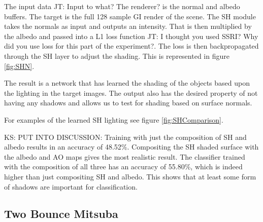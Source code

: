 \documentclass[10pt,twocolumn,letterpaper]{article}
\newcommand{\kris}[1]{{\color{red} KS: #1}}
\newcommand{\tompson}[1]{{\color{green} JT: #1}}
\begin{document}
The input data \tompson{Input to what? The renderer?} is the normal and albedo buffers.  The target is the full 128 sample GI render of the scene.  The SH module takes the normals as input and outputs an intensity.  That is then multiplied by the albedo and passed into a L1 loss function \tompson{I thought you used SSRI? Why did you use loss for this part of the experiment?}.  The loss is then backpropagated through the SH layer to adjust the shading. This is represented in figure \ref{fig:SHN}.

The result is a network that has learned the shading of the objects based upon the lighting in the target images.  The output also has the desired property of not having any shadows and allows us to test for shading based on surface normals.

For examples of the learned SH lighting see figure \ref{fig:SHComparison}.

\kris{PUT INTO DISCUSSION: Training with just the composition of SH and albedo results in an accuracy of 48.52\%.   Compositing the SH shaded surface with the albedo and AO maps gives the most realistic result.  The classifier trained with the composition of all three has an accuracy of 55.80\%, which is indeed higher than just compositing SH and albedo.  This shows that at least some form of shadows are important for classification.}


\subsection{Two Bounce Mitsuba}\label{sec:2bounce}
\end{document}
